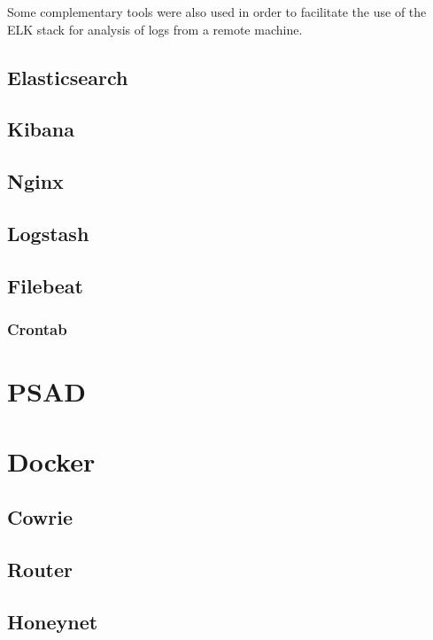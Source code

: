 Some complementary tools were also used in order to facilitate the use of the ELK stack for analysis of logs from a remote machine.

	\subsection{Elasticsearch}
	\subsection{Kibana}
	\subsection{Nginx}
	\subsection{Logstash}
	\subsection{Filebeat}
		\subsubsection{Crontab}

\section{PSAD}

\section{Docker}
	\subsection{Cowrie}
	\subsection{Router}
	\subsection{Honeynet}
